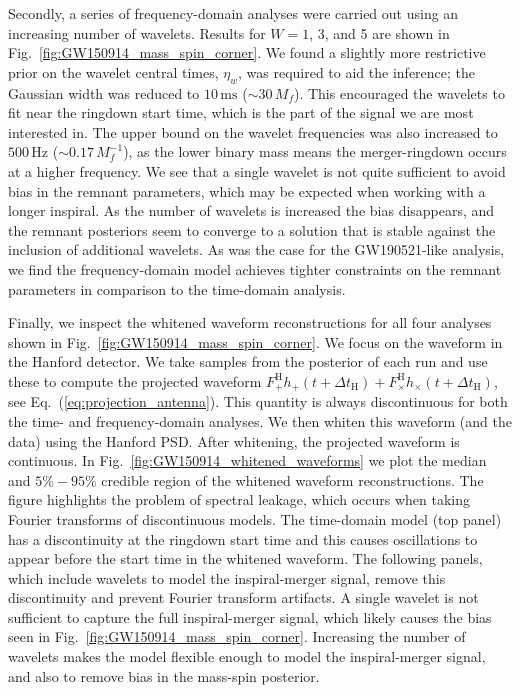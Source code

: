 Secondly, a series of frequency-domain analyses were carried out using an increasing number of wavelets.
Results for $W=1$, 3, and 5 are shown in Fig.~\ref{fig:GW150914_mass_spin_corner}.
We found a slightly more restrictive prior on the wavelet central times, $\eta_w$, was required to aid the inference; the Gaussian width was reduced to $10\,\mathrm{ms}$ ($\sim 30\,M_f$).
This encouraged the wavelets to fit near the ringdown start time, which is the part of the signal we are most interested in.
The upper bound on the wavelet frequencies was also increased to $500\,\mathrm{Hz}$ ($\sim 0.17\,M_f^{-1}$), as the lower binary mass means the merger-ringdown occurs at a higher frequency.
We see that a single wavelet is not quite sufficient to avoid bias in the remnant parameters, which may be expected when working with a longer inspiral.
As the number of wavelets is increased the bias disappears, and the remnant posteriors seem to converge to a solution that is stable against the inclusion of additional wavelets. 
As was the case for the GW190521-like analysis, we find the frequency-domain model achieves tighter constraints on the remnant parameters in comparison to the time-domain analysis. 

Finally, we inspect the whitened waveform reconstructions for all four analyses shown in Fig.~\ref{fig:GW150914_mass_spin_corner}.
We focus on the waveform in the Hanford detector.
We take samples from the posterior of each run and use these to compute the projected waveform $F^\mathrm{H}_{+} h_+(t+\Delta t_\mathrm{H})+F^\mathrm{H}_{\times} h_\times(t+\Delta t_\mathrm{H})$, see Eq.~(\ref{eq:projection_antenna}). This quantity is always discontinuous for both the time- and frequency-domain analyses.
We then whiten this waveform (and the data) using the Hanford PSD. After whitening, the projected waveform is continuous.
In Fig.~\ref{fig:GW150914_whitened_waveforms} we plot the median and $5\%-95\%$ credible region of the whitened waveform reconstructions.
The figure highlights the problem of spectral leakage, which occurs when taking Fourier transforms of discontinuous models. 
The time-domain model (top panel) has a discontinuity at the ringdown start time and this causes oscillations to appear before the start time in the whitened waveform.
The following panels, which include wavelets to model the inspiral-merger signal, remove this discontinuity and prevent Fourier transform artifacts.
A single wavelet is not sufficient to capture the full inspiral-merger signal, which likely causes the bias seen in Fig.~\ref{fig:GW150914_mass_spin_corner}. 
Increasing the number of wavelets makes the model flexible enough to model the inspiral-merger signal, and also to remove bias in the mass-spin posterior.



